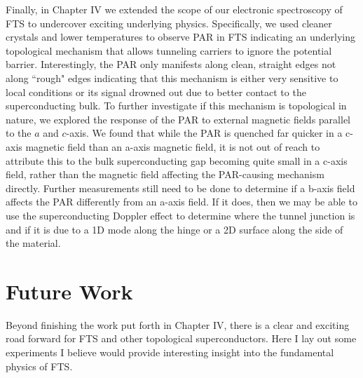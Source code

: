 Finally, in Chapter IV we extended the scope of our electronic spectroscopy of \ac{FTS} to undercover exciting underlying physics. Specifically, we used cleaner crystals and lower temperatures to observe \acl{PAR} in \ac{FTS} indicating an underlying topological mechanism that allows tunneling carriers to ignore the potential barrier. Interestingly, the \ac{PAR} only manifests along clean, straight edges not along ``rough" edges indicating that this mechanism is either very sensitive to local conditions or its signal drowned out due to better contact to the superconducting bulk. To further investigate if this mechanism is topological in nature, we explored the response of the \ac{PAR} to external magnetic fields parallel to the $a$ and $c$-axis. We found that while the \ac{PAR} is quenched far quicker in a c-axis magnetic field than an a-axis magnetic field, it is not out of reach to attribute this to the bulk superconducting gap becoming quite small in a c-axis field, rather than the magnetic field affecting the \ac{PAR}-causing mechanism directly. Further measurements still need to be done to determine if a b-axis field affects the \ac{PAR} differently from an a-axis field. If it does, then we may be able to use the superconducting Doppler effect to determine where the tunnel junction is and if it is due to a 1D mode along the hinge or a 2D surface along the side of the material.

\section{Future Work}
Beyond finishing the work put forth in Chapter IV, there is a clear and exciting road forward for \ac{FTS} and other topological superconductors. Here I lay out some experiments I believe would provide interesting insight into the fundamental physics of \ac{FTS}.
